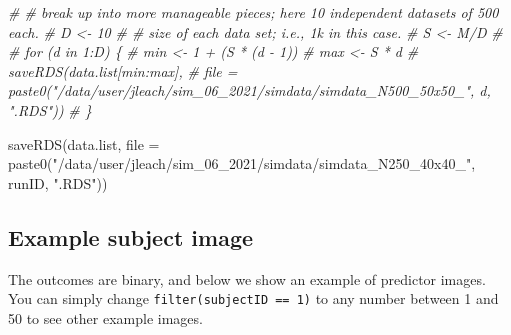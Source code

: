 \documentclass[
]{article}
\newenvironment{Shaded}{\begin{snugshade}}{\end{snugshade}}
\newcommand{\AttributeTok}[1]{\textcolor[rgb]{0.77,0.63,0.00}{#1}}
\newcommand{\CommentTok}[1]{\textcolor[rgb]{0.56,0.35,0.01}{\textit{#1}}}
\newcommand{\FunctionTok}[1]{\textcolor[rgb]{0.00,0.00,0.00}{#1}}
\newcommand{\NormalTok}[1]{#1}
\newcommand{\StringTok}[1]{\textcolor[rgb]{0.31,0.60,0.02}{#1}}
\begin{document}
\begin{Shaded}
\begin{Highlighting}[]
\CommentTok{\# \# break up into more manageable pieces; here 10 independent datasets of 500 each.}
\CommentTok{\# D \textless{}{-} 10}
\CommentTok{\# \# size of each data set; i.e., 1k in this case.}
\CommentTok{\# S \textless{}{-} M/D}
\CommentTok{\# }
\CommentTok{\# for (d in 1:D) \{}
\CommentTok{\#   min \textless{}{-} 1 + (S * (d {-} 1))}
\CommentTok{\#   max \textless{}{-} S * d}
\CommentTok{\#   saveRDS(data.list[min:max], }
\CommentTok{\#           file = paste0("/data/user/jleach/sim\_06\_2021/simdata/simdata\_N500\_50x50\_", d, ".RDS"))}
\CommentTok{\# \}}

\FunctionTok{saveRDS}\NormalTok{(data.list,}
        \AttributeTok{file =} \FunctionTok{paste0}\NormalTok{(}\StringTok{"/data/user/jleach/sim\_06\_2021/simdata/simdata\_N250\_40x40\_"}\NormalTok{, runID, }\StringTok{".RDS"}\NormalTok{))}
\end{Highlighting}
\end{Shaded}

\hypertarget{example-subject-image}{%
\subsection{Example subject image}\label{example-subject-image}}

The outcomes are binary, and below we show an example of predictor
images. You can simply change \texttt{filter(subjectID\ ==\ 1)} to any
number between 1 and 50 to see other example images.
\end{document}
